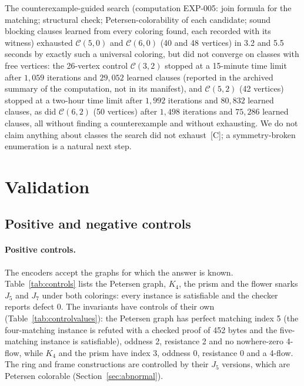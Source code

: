 \documentclass[11pt]{article}
\theoremstyle{definition}
\theoremstyle{remark}
\newcommand{\cj}{\textup{[C]}}
\begin{document}
The counterexample-guided search (computation EXP-005: join formula for the matching; structural
check; Petersen-colorability of each candidate; sound blocking clauses learned from every
coloring found, each recorded with its witness) exhausted $\mathcal C(5,0)$ and $\mathcal C(6,0)$
(40 and 48 vertices) in 3.2 and 5.5 seconds by exactly such a universal coloring, but did not converge
on classes with free vertices: the 26-vertex control $\mathcal C(3,2)$ stopped at a 15-minute time limit
after $1{,}059$ iterations and $29{,}052$ learned clauses (reported in the archived summary of the
computation, not in its manifest), and $\mathcal C(5,2)$ (42 vertices) stopped
at a two-hour time limit after $1{,}992$ iterations and $80{,}832$ learned clauses, as did $\mathcal C(6,2)$
(50 vertices) after $1{,}498$ iterations and $75{,}286$ learned clauses, all without finding a
counterexample and without exhausting. We do not claim anything about classes the search did not
exhaust~\cj{}; a symmetry-broken enumeration is a natural next step.

\section{Validation}\label{sec:validation}

\subsection{Positive and negative controls}

\paragraph{Positive controls.} The encoders accept the graphs for which the answer is known.
Table~\ref{tab:controls} lists the Petersen graph, $K_4$, the prism and the flower snarks $J_5$ and
$J_7$ under both colorings: every instance is satisfiable and the checker reports defect 0. The
invariants have controls of their own (Table~\ref{tab:controlvalues}): the Petersen graph has
perfect matching index 5 (the four-matching instance is refuted with a checked proof of 452 bytes and
the five-matching instance is satisfiable), oddness 2, resistance 2 and no nowhere-zero 4-flow, while
$K_4$ and the prism have index 3, oddness 0, resistance 0 and a 4-flow. The ring and frame
constructions are controlled by their $J_5$ versions, which are Petersen colorable (Section~\ref{sec:abnormal}).

\begin{table}[htbp]\centering\footnotesize\setlength{\tabcolsep}{3pt}

\caption{Colorable control graphs under the Petersen and the normal-5 encodings (computation
EXP-001): both formulas are satisfiable and the independent checker reports defect 0.}\label{tab:controls}
\end{table}
\end{document}
